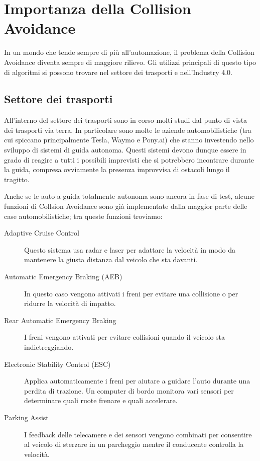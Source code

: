 \documentclass[Lau, binding=0.6cm, oneside]{sapthesis}
\begin{document}
\section{Importanza della Collision Avoidance}
In un mondo che tende sempre di più all'automazione, il problema della Collision Avoidance diventa sempre di maggiore rilievo.
Gli utilizzi principali di questo tipo di algoritmi si possono trovare nel settore dei trasporti e nell'Industry 4.0.

\subsection{Settore dei trasporti}
All'interno del settore dei trasporti sono in corso molti studi dal punto di vista dei trasporti via terra.
In particolare sono molte le aziende automobilistiche (tra cui spiccano principalmente Tesla, Waymo e Pony.ai) che stanno investendo nello sviluppo di sistemi di guida autonoma.
Questi sistemi devono dunque essere in grado di reagire a tutti i possibili imprevisti che si potrebbero incontrare durante la guida, compresa ovviamente la presenza improvvisa di ostacoli lungo il tragitto.

Anche se le auto a guida totalmente autonoma sono ancora in fase di test, alcune funzioni di Collsion Avoidance sono già implementate dalla maggior parte delle case automobilistiche; tra queste funzioni troviamo\cite{fonte8}:
\begin{description}
	\item[Adaptive Cruise Control] Questo sistema usa radar e laser per adattare la velocità in modo da mantenere la giusta distanza dal veicolo che sta davanti.
	\item[Automatic Emergency Braking (AEB)] In questo caso vengono attivati i freni per evitare una collisione o per ridurre la velocità di impatto.
	\item[Rear Automatic Emergency Braking] I freni vengono attivati per evitare collisioni quando il veicolo sta indietreggiando.
	\item[Electronic Stability Control (ESC)] Applica automaticamente i freni per aiutare a guidare l'auto durante una perdita di trazione. Un computer di bordo monitora vari sensori per determinare quali ruote frenare e quali accelerare.
	\item[Parking Assist] I feedback delle telecamere e dei sensori vengono combinati per consentire al veicolo di sterzare in un parcheggio mentre il conducente controlla la velocità.
\end{description} 
\end{document}
